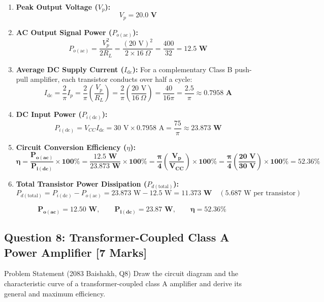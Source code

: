 \documentclass[11pt,a4paper,oneside]{book}
\begin{document}
\begin{enumerate}[leftmargin=1.5em]
  \item \textbf{Peak Output Voltage ($V_p$):}
  \[
  V_p = \mathbf{20.0\text{ V}}
  \]
  \item \textbf{AC Output Signal Power ($P_{o(\text{ac})}$):}
  \[
  P_{o(\text{ac})} = \frac{V_p^2}{2 R_L} = \frac{(20\text{ V})^2}{2 \times 16\ \Omega} = \frac{400}{32} = \mathbf{12.5\text{ W}}
  \]
  \item \textbf{Average DC Supply Current ($I_{\text{dc}}$):}
  For a complementary Class B push-pull amplifier, each transistor conducts over half a cycle:
  \[
  I_{\text{dc}} = \frac{2}{\pi} I_p = \frac{2}{\pi} \left(\frac{V_p}{R_L}\right) = \frac{2}{\pi} \left(\frac{20\text{ V}}{16\ \Omega}\right) = \frac{40}{16\pi} = \frac{2.5}{\pi} \approx \mathbf{0.7958\text{ A}}
  \]
  \item \textbf{DC Input Power ($P_{i(\text{dc})}$):}
  \[
  P_{i(\text{dc})} = V_{CC} I_{\text{dc}} = 30\text{ V} \times 0.7958\text{ A} = \frac{75}{\pi} \approx \mathbf{23.873\text{ W}}
  \]
  \item \textbf{Circuit Conversion Efficiency ($\eta$):}
  \[
  \mathbf{\eta = \frac{P_{o(\text{ac})}}{P_{i(\text{dc})}} \times 100\% = \frac{12.5\text{ W}}{23.873\text{ W}} \times 100\% = \frac{\pi}{4} \left(\frac{V_p}{V_{CC}}\right) \times 100\% = \frac{\pi}{4} \left(\frac{20\text{ V}}{30\text{ V}}\right) \times 100\% = \mathbf{52.36\%}}
  \]
  \item \textbf{Total Transistor Power Dissipation ($P_{d(\text{total})}$):}
  \[
  P_{d(\text{total})} = P_{i(\text{dc})} - P_{o(\text{ac})} = 23.873\text{ W} - 12.5\text{ W} = \mathbf{11.373\text{ W}} \quad (5.687\text{ W per transistor})
  \]
\end{enumerate}

\begin{answerbox}
$$\mathbf{P_{o(\text{ac})} = 12.50\text{ W}, \qquad P_{i(\text{dc})} = 23.87\text{ W}, \qquad \eta = 52.36\%}$$
\end{answerbox}

\vspace{0.6cm}

\subsection{Question 8: Transformer-Coupled Class A Power Amplifier [7 Marks]}
\begin{questionbox}{Problem Statement (2083 Baishakh, Q8)}
Draw the circuit diagram and the characteristic curve of a transformer-coupled class A amplifier and derive its general and maximum efficiency.
\end{questionbox}
\end{document}
